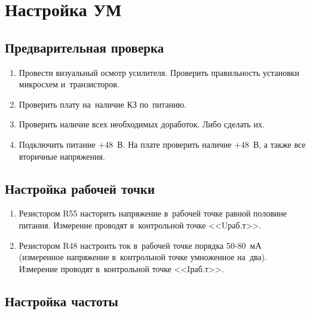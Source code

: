\section{Настройка УМ}

\subsection{Предварительная проверка}

\begin{enumerate}
	\item Провести визуальный осмотр усилителя. Проверить правильность установки микросхем и~транзисторов. 
	\item Проверить плату на~наличие КЗ по~питанию.
	\item Проверить наличие всех необходимых доработок. Либо сделать их.
	\item Подключить питание +48~В. На плате проверить наличие +48~В, а также все вторичные напряжения.
\end{enumerate}



\subsection{Настройка рабочей точки}

\begin{enumerate}
	\item Резистором R55 насторить напряжение в~рабочей точке равной половине питания. Измерение проводят в~контрольной точке <<Uраб.т>>.
	\item Резистором R48 настроить ток в~рабочей точке порядка 50-80~мА (измеренное напряжение в~контрольной точке умноженное на~два). Измерение проводят в~контрольной точке <<Iраб.т>>.	
\end{enumerate}



\subsection{Настройка частоты}

